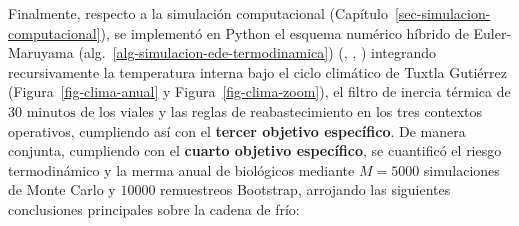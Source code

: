 \documentclass[
  spanish,
  us-letterpaper,
]{scrreprt}
\numberwithin{equation}{section}
\theoremstyle{plain}
\theoremstyle{plain}
\theoremstyle{plain}
\theoremstyle{definition}
\theoremstyle{remark}
\begin{document}
Finalmente, respecto a la simulación computacional
(Capítulo~\ref{sec-simulacion-computacional}), se implementó en Python
el esquema numérico híbrido de Euler-Maruyama
(alg.~\ref{alg-simulacion-ede-termodinamica})
(,
,
) integrando recursivamente la
temperatura interna bajo el ciclo climático de Tuxtla Gutiérrez
(Figura~\ref{fig-clima-anual} y Figura~\ref{fig-clima-zoom}), el filtro
de inercia térmica de \(30\text{ minutos}\) de los viales y las reglas
de reabastecimiento en los tres contextos operativos, cumpliendo así con
el \textbf{tercer objetivo específico}. De manera conjunta, cumpliendo
con el \textbf{cuarto objetivo específico}, se cuantificó el riesgo
termodinámico y la merma anual de biológicos mediante \(M = 5000\)
simulaciones de Monte Carlo y \(10000\) remuestreos Bootstrap, arrojando
las siguientes conclusiones principales sobre la cadena de frío:
\end{document}
